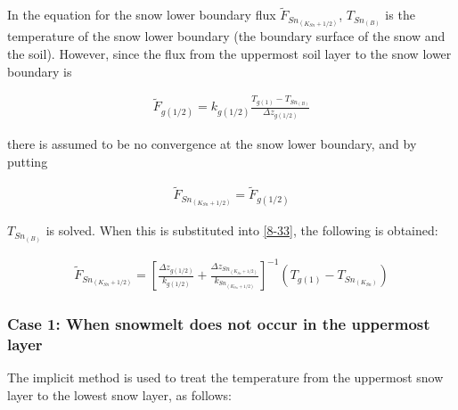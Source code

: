 In the equation for the snow lower boundary flux \(\widetilde{F}_{Sn_{(K_{Sn}+1/2)}}\), \(T_{Sn_{(B)}}\) is the temperature of the snow lower boundary (the boundary surface of the snow and the soil).
However, since the flux from the uppermost soil layer to the snow lower boundary is

\begin{eqnarray}
\widetilde{F}_{g(1/2)} = k_{g(1/2)} \frac{T_{g(1)}-T_{Sn_{(B)}}}{\Delta z_{g(1/2)}} \label{8-35}
\end{eqnarray}

there is assumed to be no convergence at the snow lower boundary, and by putting

\begin{eqnarray}
\widetilde{F}_{Sn_{(K_{Sn}+1/2)}} = \widetilde{F}_{g(1/2)} \label{8-36}
\end{eqnarray}

\(T_{Sn_{(B)}}\) is solved. When this is substituted into \ref{8-33}, the following is obtained:

\begin{eqnarray}
\widetilde{F}_{Sn_{(K_{Sn}+1/2)}}
 = \left[ \frac{\Delta z_{g(1/2)}}{k_{g(1/2)}}
  +\frac{\Delta z_{Sn_{(K_{Sn}+1/2)}}}{k_{Sn_{(K_{Sn}+1/2)}}}
 \right]^{-1}
 (T_{g(1)} - T_{Sn_{(K_{Sn})}}) \label{8-37}
\end{eqnarray}

\hypertarget{case-1-when-snowmelt-does-not-occur-in-the-uppermost-layer}{%
\subsubsection{Case 1: When snowmelt does not occur in the uppermost layer}\label{case-1-when-snowmelt-does-not-occur-in-the-uppermost-layer}}

The implicit method is used to treat the temperature from the uppermost snow layer to the lowest snow layer, as follows:

